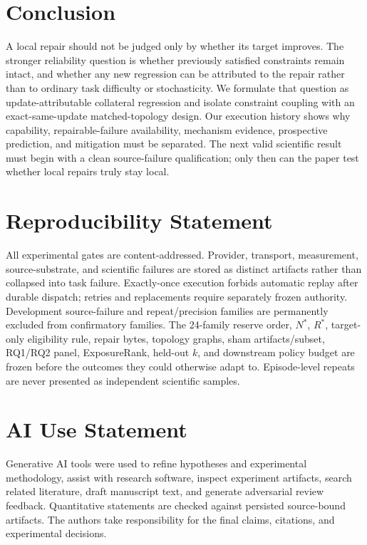 \documentclass{article}
\begin{document}
\section{Conclusion}
A local repair should not be judged only by whether its target improves. The stronger reliability question is whether previously satisfied constraints remain intact, and whether any new regression can be attributed to the repair rather than to ordinary task difficulty or stochasticity. We formulate that question as update-attributable collateral regression and isolate constraint coupling with an exact-same-update matched-topology design. Our execution history shows why capability, repairable-failure availability, mechanism evidence, prospective prediction, and mitigation must be separated. The next valid scientific result must begin with a clean source-failure qualification; only then can the paper test whether local repairs truly stay local.

\section*{Reproducibility Statement}
All experimental gates are content-addressed. Provider, transport, measurement, source-substrate, and scientific failures are stored as distinct artifacts rather than collapsed into task failure. Exactly-once execution forbids automatic replay after durable dispatch; retries and replacements require separately frozen authority. Development source-failure and repeat/precision families are permanently excluded from confirmatory families. The 24-family reserve order, $N^*$, $R^*$, target-only eligibility rule, repair bytes, topology graphs, sham artifacts/subset, RQ1/RQ2 panel, ExposureRank, held-out $k$, and downstream policy budget are frozen before the outcomes they could otherwise adapt to. Episode-level repeats are never presented as independent scientific samples.

\section*{AI Use Statement}
Generative AI tools were used to refine hypotheses and experimental methodology, assist with research software, inspect experiment artifacts, search related literature, draft manuscript text, and generate adversarial review feedback. Quantitative statements are checked against persisted source-bound artifacts. The authors take responsibility for the final claims, citations, and experimental decisions.
\end{document}
